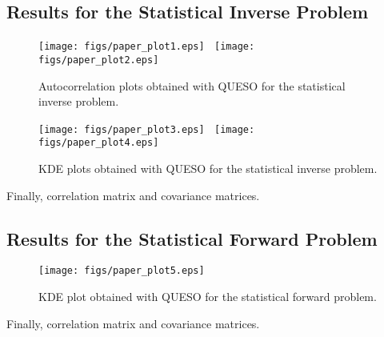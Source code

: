 \subsection{Results for the Statistical Inverse Problem}

\begin{figure}[h!]
\centerline{
\texttt{[image: figs/paper\_plot1.eps]}
$~$
\texttt{[image: figs/paper\_plot2.eps]}
}
\caption{
Autocorrelation plots obtained with QUESO for the statistical inverse problem.
}
\label{fig-sip-autocorr-plots}
\end{figure}

\begin{figure}[h!]
\centerline{
\texttt{[image: figs/paper\_plot3.eps]}
$~$
\texttt{[image: figs/paper\_plot4.eps]}
}
\caption{
KDE plots obtained with QUESO for the statistical inverse problem.
}
\label{fig-sip-hist-kde-plots}
\end{figure}

Finally, correlation matrix and covariance matrices.

\clearpage

\subsection{Results for the Statistical Forward Problem}

\begin{figure}[h!]
\centerline{
\texttt{[image: figs/paper\_plot5.eps]}
}
\caption{
KDE plot obtained with QUESO for the statistical forward problem.
}
\label{fig-sfp-hist-kde-plots}
\end{figure}

Finally, correlation matrix and covariance matrices.

